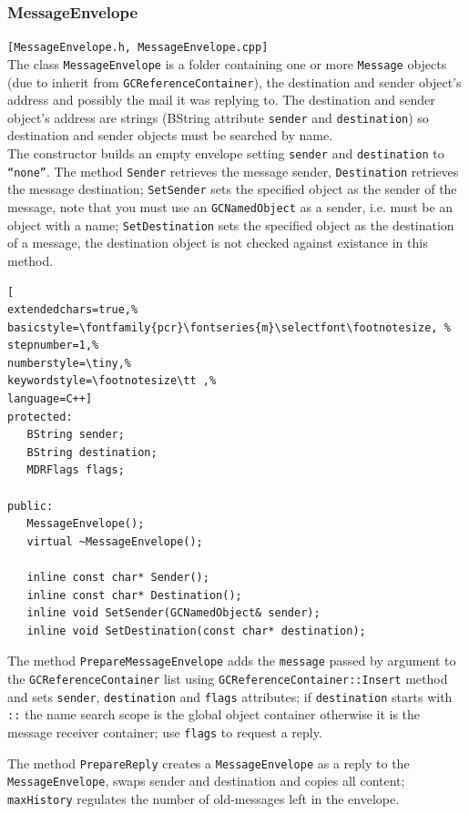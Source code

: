 \subsubsection{MessageEnvelope}
\texttt{[MessageEnvelope.h, MessageEnvelope.cpp]}\\
The class \texttt{MessageEnvelope} is a folder containing one or more \texttt{Message} objects (due to inherit from \texttt{GCReferenceContainer}), the destination and sender object's address and possibly the mail it was replying to. The destination and sender object's address are strings (BString attribute \texttt{sender} and \texttt{destination}) so destination and sender objects must be searched by name. \\


The constructor builds an empty envelope setting \texttt{sender} and \texttt{destination} to \texttt{``none''}. The method \texttt{Sender} retrieves the message sender, \texttt{Destination} retrieves the message destination; \texttt{SetSender} sets the specified object as the sender of the message, note that you must use an \texttt{GCNamedObject} as a sender, i.e. must be an object with a name; \texttt{SetDestination} sets the specified object as the destination of a message, the destination object is not checked against existance in this method.
\begin{lstlisting}[
extendedchars=true,%
basicstyle=\fontfamily{pcr}\fontseries{m}\selectfont\footnotesize, %
stepnumber=1,%
numberstyle=\tiny,%
keywordstyle=\footnotesize\tt ,%
language=C++]
protected:
   BString sender;
   BString destination;
   MDRFlags flags;

public:
   MessageEnvelope();
   virtual ~MessageEnvelope();

   inline const char* Sender();
   inline const char* Destination();
   inline void SetSender(GCNamedObject& sender);
   inline void SetDestination(const char* destination);
\end{lstlisting}

The method \texttt{PrepareMessageEnvelope} adds the \texttt{message} passed by argument to the \texttt{GCReferenceContainer} list using \texttt{GCReferenceContainer::Insert} method and sets \texttt{sender}, \texttt{destination} and \texttt{flags} attributes; if \texttt{destination} starts with \texttt{::} the name search scope is the global object container otherwise it is the message receiver container; use \texttt{flags} to request a reply.

The method \texttt{PrepareReply} creates a \texttt{MessageEnvelope} as a reply to the \texttt{MessageEnvelope}, swaps sender and destination and copies all content; \texttt{maxHistory} regulates the number of old-messages left in the envelope.

